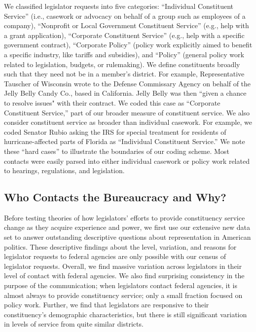 \documentclass[12pt]{article}
\begin{document}
We classified legislator requests into five categories: ``Individual Constituent Service'' (i.e., casework or advocacy on behalf of a group such as employees of a company), ``Nonprofit or Local Government Constituent Service'' (e.g., help with a grant application), ``Corporate Constituent Service'' (e.g., help with a specific government contract), ``Corporate Policy'' (policy work explicitly aimed to benefit a specific industry, like tariffs and subsidies), and ``Policy'' (general policy work related to legislation, budgets, or rulemaking). We define constituents broadly such that they need not be in a member's district. For example, Representative Tauscher of Wisconsin wrote to the Defense Commissary Agency on behalf of the Jelly Belly Candy Co., based in California. Jelly Belly was then ``given a chance to resolve issues" with their contract. We coded this case as ``Corporate Constituent Service,'' part of our broader measure of constituent service. We also consider constituent service as broader than individual casework. For example, we coded Senator Rubio asking the IRS for special treatment for residents of hurricane-affected parts of Florida as ``Individual Constituent Service.'' We note these ``hard cases'' to illustrate the boundaries of our coding scheme. Most contacts were easily parsed into either individual casework or policy work related to hearings, regulations, and legislation.


\subsection{Who Contacts the Bureaucracy and Why?} \label{s:descriptive} 
Before testing theories of how legislators' efforts to provide constituency service change as they acquire experience and power, we first use our extensive new data set to answer outstanding descriptive questions about representation in American politics. These descriptive findings about the level, variation, and reasons for legislator requests to federal agencies are only possible with our census of legislator requests. Overall, we find massive variation across legislators in their level of contact with federal agencies. We also find surprising consistency in the purpose of the communication; when legislators contact federal agencies, it is almost always to provide constituency service; only a small fraction focused on policy work. Further, we find that legislators are responsive to their constituency's demographic characteristics, but there is still significant variation in levels of service from quite similar districts.  
\end{document}

